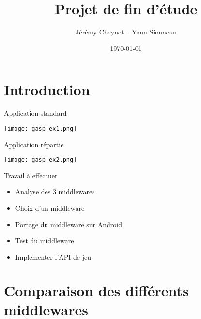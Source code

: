 \documentclass{beamer}
\title{Projet de fin d'étude}
\author{Jérémy Cheynet -- Yann Sionneau}
\institute{Télécom SudParis}
\date{\today}
\begin{document}
\begin{frame}
  \titlepage
\end{frame}

\begin{frame}
  \tableofcontents[]
\end{frame}



\section{Introduction}

\begin{frame}
  \tableofcontents[currentsection]
\end{frame}

\begin{frame}
  \begin{block}{Application standard}
    \begin{center}
      \texttt{[image: gasp\_ex1.png]}
    \end{center}
  \end{block}
\end{frame}

\begin{frame}
  \begin{block}{Application répartie}
    \begin{center}
      \texttt{[image: gasp\_ex2.png]}
    \end{center}
  \end{block}
\end{frame}

\begin{frame}
  \begin{block}{Travail à effectuer}
    \begin{itemize}
      \item Analyse des 3 middlewares
      \item Choix d'un middleware
      \item Portage du middleware sur Android
      \item Test du middleware
      \item Implémenter l'API de jeu
    \end{itemize}
  \end{block}
\end{frame}




\section{Comparaison des différents middlewares}
\end{document}
